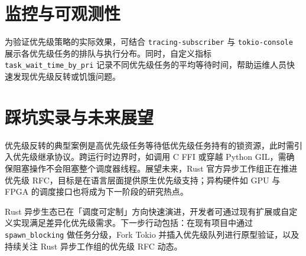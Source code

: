 \section{监控与可观测性}
为验证优先级策略的实际效果，可结合 \texttt{tracing-subscriber} 与 \texttt{tokio-console} 展示各优先级任务的排队与执行分布。同时，自定义指标 \texttt{task\_{}wait\_{}time\_{}by\_{}pri} 记录不同优先级任务的平均等待时间，帮助运维人员快速发现优先级反转或饥饿问题。\par
\section{踩坑实录与未来展望}
优先级反转的典型案例是高优先级任务等待低优先级任务持有的锁资源，此时需引入优先级继承协议。跨运行时边界时，如调用 C FFI 或穿越 Python GIL，需确保阻塞操作不会阻塞整个调度器线程。展望未来，Rust 官方异步工作组正在推进优先级 RFC，目标是在语言层面提供原生优先级支持；异构硬件如 GPU 与 FPGA 的调度接口也将成为下一阶段的研究热点。\par
Rust 异步生态已在「调度可定制」方向快速演进，开发者可通过现有扩展或自定义实现满足差异化优先级需求。下一步行动包括：在现有项目中通过 \texttt{spawn\_{}blocking} 做任务分级，Fork Tokio 并插入优先级队列进行原型验证，以及持续关注 Rust 异步工作组的优先级 RFC 动态。\par
